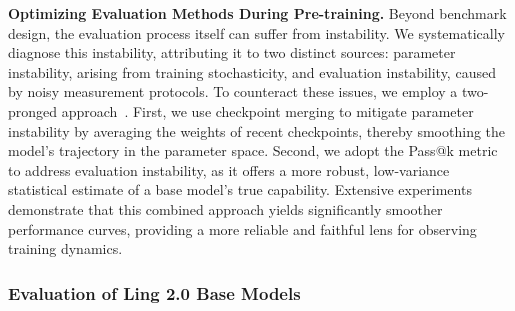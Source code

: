 \documentclass[table]{gtech}
\theoremstyle{definition}
\begin{document}
{\bfseries Optimizing Evaluation Methods During Pre-training. }
Beyond benchmark design, the evaluation process itself can suffer from instability. We systematically diagnose this instability, attributing it to two distinct sources: parameter instability, arising from training stochasticity, and evaluation instability, caused by noisy measurement protocols. 
To counteract these issues, we employ a two-pronged approach~\citep{wang2025map}. First, we use checkpoint merging to mitigate parameter instability by averaging the weights of recent checkpoints, thereby smoothing the model's trajectory in the parameter space. Second, we adopt the Pass@k metric to address evaluation instability, as it offers a more robust, low-variance statistical estimate of a base model's true capability. Extensive experiments demonstrate that this combined approach yields significantly smoother performance curves, providing a more reliable and faithful lens for observing training dynamics.

\subsubsection{{Evaluation of Ling 2.0 Base Models}}
\label{sec:eval_base_results}
\end{document}

